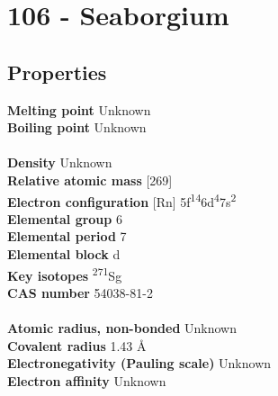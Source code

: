 \section{106 - Seaborgium}
\label{sec:elem-seaborgium}
\subsection{Properties}
\textbf{Melting point} Unknown\\
\textbf{Boiling point} Unknown\\
\\
\textbf{Density} Unknown\\
\textbf{Relative atomic mass} [269]\\
\textbf{Electron configuration} [Rn] 5f\textsuperscript{14}6d\textsuperscript{4}7s\textsuperscript{2}\\
\textbf{Elemental group} 6\\
\textbf{Elemental period} 7\\
\textbf{Elemental block} d\\
\textbf{Key isotopes} \textsuperscript{271}Sg\\
\textbf{CAS number} 54038-81-2\\
\\
\textbf{Atomic radius, non-bonded} Unknown\\
\textbf{Covalent radius} 1.43 Å\\
\textbf{Electronegativity (Pauling scale)} Unknown\\
\textbf{Electron affinity} Unknown\\
